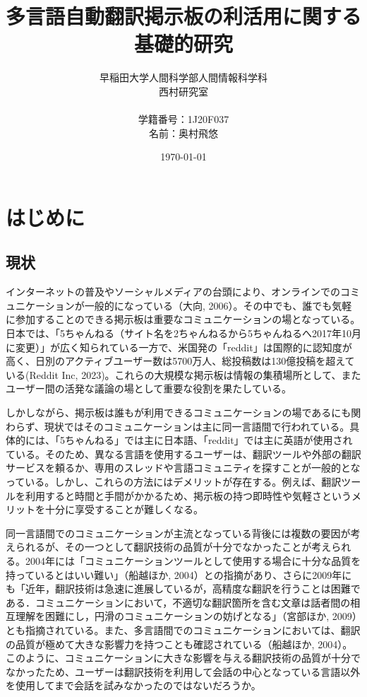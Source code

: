 \documentclass[b5paper,12pt]{jsreport}
\title{多言語自動翻訳掲示板の利活用に関する基礎的研究}
\author{早稲田大学人間科学部人間情報科学科\\
西村研究室\\
\\
学籍番号：1J20F037\\
名前：奥村飛悠}
\date{\today}
\begin{document}
\maketitle
\tableofcontents

\chapter{はじめに}

\section{現状}

インターネットの普及やソーシャルメディアの台頭により、オンラインでのコミュニケーションが一般的になっている（大向, 2006）。その中でも、誰でも気軽に参加することのできる掲示板は重要なコミュニケーションの場となっている。日本では、「5ちゃんねる（サイト名を2ちゃんねるから5ちゃんねるへ2017年10月に変更）」が広く知られている一方で、米国発の「reddit」は国際的に認知度が高く、日別のアクティブユーザー数は5700万人、総投稿数は130億投稿を超えている(Reddit Inc, 2023)。これらの大規模な掲示板は情報の集積場所として、またユーザー間の活発な議論の場として重要な役割を果たしている。

しかしながら、掲示板は誰もが利用できるコミュニケーションの場であるにも関わらず、現状ではそのコミュニケーションは主に同一言語間で行われている。具体的には、「5ちゃんねる」では主に日本語、「reddit」では主に英語が使用されている。そのため、異なる言語を使用するユーザーは、翻訳ツールや外部の翻訳サービスを頼るか、専用のスレッドや言語コミュニティを探すことが一般的となっている。しかし、これらの方法にはデメリットが存在する。例えば、翻訳ツールを利用すると時間と手間がかかるため、掲示板の持つ即時性や気軽さというメリットを十分に享受することが難しくなる。

同一言語間でのコミュニケーションが主流となっている背後には複数の要因が考えられるが、その一つとして翻訳技術の品質が十分でなかったことが考えられる。2004年には「コミュニケーションツールとして使用する場合に十分な品質を持っているとはいい難い」（船越ほか, 2004）との指摘があり、さらに2009年にも「近年，翻訳技術は急速に進展しているが，高精度な翻訳を行うことは困難である．コミュニケーションにおいて，不適切な翻訳箇所を含む文章は話者間の相互理解を困難にし，円滑のコミュニケーションの妨げとなる」（宮部ほか, 2009）とも指摘されている。また、多言語間でのコミュニケーションにおいては、翻訳の品質が極めて大きな影響力を持つことも確認されている（船越ほか, 2004）。このように、コミュニケーションに大きな影響を与える翻訳技術の品質が十分でなかったため、ユーザーは翻訳技術を利用して会話の中心となっている言語以外を使用してまで会話を試みなかったのではないだろうか。
\end{document}
